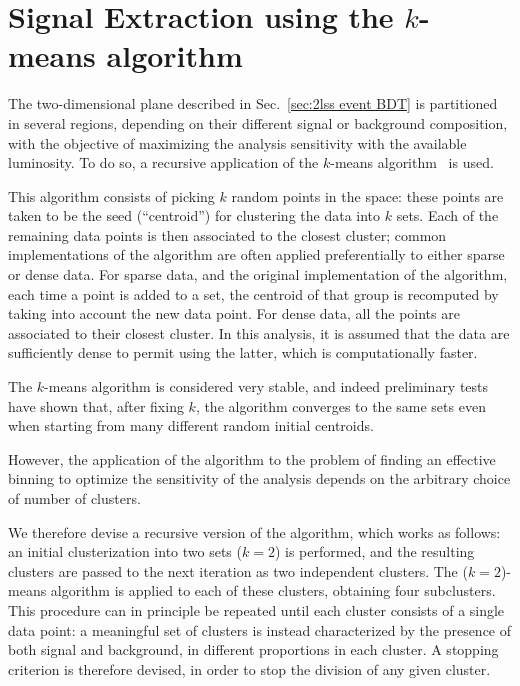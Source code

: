\section{Signal Extraction using the $k$-means algorithm}\label{sec:kmeans}

The two-dimensional plane described in Sec.~\ref{sec:2lss event BDT} is partitioned in several regions, depending on their different
signal or background composition, with the objective of maximizing the analysis sensitivity with the available luminosity. To do so, a recursive application of the $k$-means algorithm~\cite{MR0090073,macqueen1967} is used.

This algorithm consists of picking $k$ random points in the space: these points are taken to be the seed (``centroid'')
for clustering the data into $k$ sets. Each of the remaining data points is then associated to the closest cluster; common implementations of the algorithm are often applied preferentially to either sparse or dense data. For sparse data, and the original implementation of the algorithm, each time a point is added to a set, the centroid of that group is recomputed by taking into account the new data point. For dense data, all the points are associated to their closest cluster. In this analysis, it is assumed that the data are sufficiently dense to permit using the latter, which is computationally faster.

The $k$-means algorithm is considered very stable, and indeed preliminary tests have shown that, after fixing $k$, the algorithm converges to the same sets even when starting from many different random initial centroids.

However, the application of the algorithm to the problem of finding an effective binning to optimize the sensitivity of the analysis depends on the arbitrary choice of number of clusters.

We therefore devise a recursive version of the algorithm, which works as follows: an initial clusterization into two sets ($k=2$) is performed, and the resulting clusters are passed to the next iteration as two independent clusters. The ($k=2$)-means algorithm is applied to each of these clusters, obtaining four subclusters. This procedure can in principle be repeated until each cluster consists of a single data point: a meaningful set of clusters is instead characterized by the presence of both signal and background, in different proportions in each cluster. A stopping criterion is therefore devised, in order to stop the division of any given cluster.

